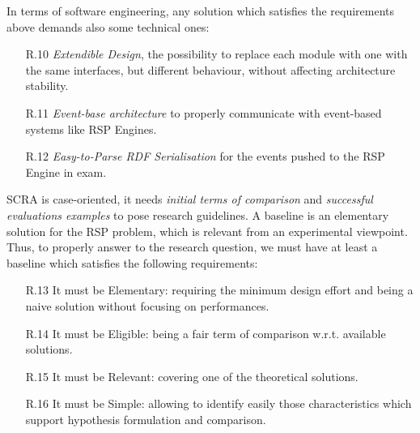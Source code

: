 In terms of software engineering, any solution which satisfies the requirements above demands also some technical ones: 
\begin{enumerate}
\item[R.10] \textit{Extendible Design}, the possibility to replace each module with one with the same interfaces, but different behaviour, without affecting architecture stability.
\item[R.11] \textit{Event-base architecture} to properly communicate with event-based systems like RSP Engines.
\item[R.12] \textit{Easy-to-Parse RDF Serialisation} for the events pushed to the RSP Engine in exam.
\end{enumerate}

\noindent SCRA is case-oriented, it needs  \textit{initial terms of comparison} and \textit{successful evaluations examples} to pose research guidelines. A baseline is an elementary solution for the RSP problem, which is relevant from an experimental viewpoint. Thus, to properly answer to the research question, we must have at least a baseline which satisfies the following requirements: 
\begin{enumerate}
\item[R.13] It must be Elementary: requiring the minimum design effort and being a naive solution without focusing on performances.  %
\item[R.14] It must be Eligible: being a fair term of comparison w.r.t. available solutions. %
\item[R.15] It must be Relevant: covering one of the theoretical solutions. %
\item[R.16] It must be Simple: allowing to identify easily those characteristics which support hypothesis formulation and comparison.  %
\end{enumerate}

